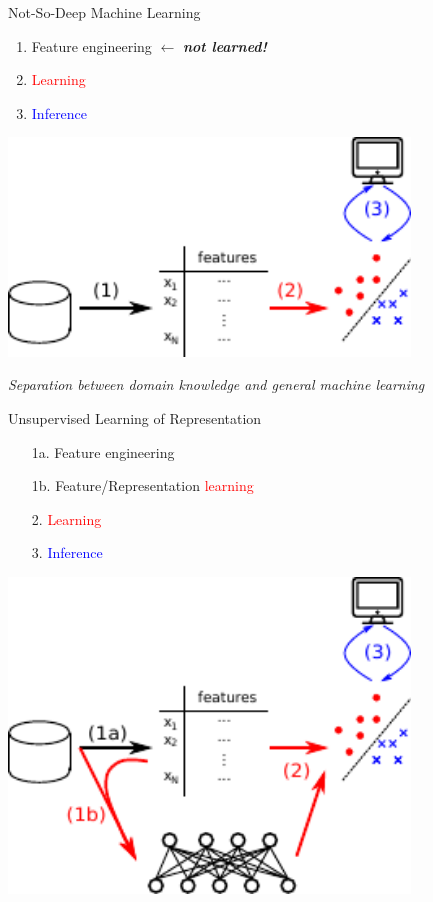 \documentclass{beamer}
\newcommand{\tred}[1]{\textcolor{red}{#1}}
\newcommand{\tblue}[1]{\textcolor{blue}{#1}}
\begin{document}
\begin{frame}{Not-So-Deep Machine Learning}
    \raggedright
    \begin{enumerate}
        \item Feature engineering $\leftarrow$ {\bf \emph{not learned!}}
        \item \tred{Learning}
        \item \tblue{Inference}
    \end{enumerate}

    \vspace{-24mm}
    \begin{center}
    \includegraphics[width=0.8\textwidth]{pipeline1.pdf}
    \end{center}

    \emph{Separation between domain knowledge and general
    machine learning}

\end{frame}

\begin{frame}{Unsupervised Learning of Representation}
    \raggedright
    \begin{enumerate}
    \itemsep 0em
        \item[1a.] Feature engineering
        \item[1b.] Feature/Representation \tred{learning}
        \item[2.] \tred{Learning}
        \item[3.] \tblue{Inference}
    \end{enumerate}

    \vspace{-28mm}
    \begin{center}
    \includegraphics[width=0.8\textwidth]{pipeline2.pdf}
    \end{center}

\end{frame}
\end{document}
